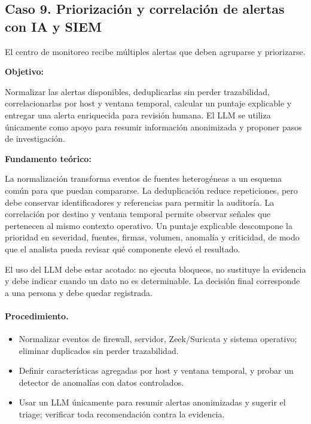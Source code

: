 \subsection{Caso 9. Priorización y correlación de alertas con IA y SIEM}
\label{caso:siem-alertas}

\begin{situacion}
El centro de monitoreo recibe múltiples alertas que deben agruparse y priorizarse.

\textbf{Objetivo:} \par
Normalizar las alertas disponibles, deduplicarlas sin perder trazabilidad, correlacionarlas por host y ventana temporal, calcular un puntaje explicable y entregar una alerta enriquecida para revisión humana. El LLM se utiliza únicamente como apoyo para resumir información anonimizada y proponer pasos de investigación.

\textbf{Fundamento teórico:} \par
La normalización transforma eventos de fuentes heterogéneas a un esquema común para que puedan compararse. La deduplicación reduce repeticiones, pero debe conservar identificadores y referencias para permitir la auditoría. La correlación por destino y ventana temporal permite observar señales que pertenecen al mismo contexto operativo. Un puntaje explicable descompone la prioridad en severidad, fuentes, firmas, volumen, anomalía y criticidad, de modo que el analista pueda revisar qué componente elevó el resultado.

El uso del LLM debe estar acotado: no ejecuta bloqueos, no sustituye la evidencia y debe indicar cuando un dato no es determinable. La decisión final corresponde a una persona y debe quedar registrada.
\end{situacion}

\paragraph{Procedimiento.}
\begin{itemize}[leftmargin=*, topsep=2pt, itemsep=2pt]
\item Normalizar eventos de firewall, servidor, Zeek/Suricata y sistema operativo; eliminar duplicados sin perder trazabilidad.
\item Definir características agregadas por host y ventana temporal, y probar un detector de anomalías con datos controlados.
\item Usar un LLM únicamente para resumir alertas anonimizadas y sugerir el triage; verificar toda recomendación contra la evidencia.
\end{itemize}

